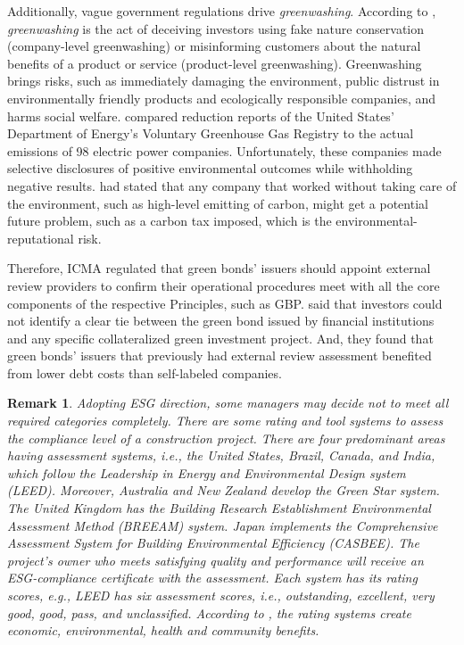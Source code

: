 \documentclass[sn-basic]{sn-jnl}%
\theoremstyle{thmstyleone}%
\theoremstyle{thmstyletwo}%
\newtheorem{remark}{Remark}%
\theoremstyle{thmstylethree}%
\begin{document}
Additionally, vague government regulations drive \emph{greenwashing}. According to \citet{delmas2011drivers}, \emph{greenwashing} is the act of deceiving investors using fake nature conservation (company-level greenwashing) or misinforming customers about the natural benefits of a product or service (product-level greenwashing). Greenwashing brings risks, such as immediately damaging the environment, public distrust in environmentally friendly products and ecologically responsible companies, and harms social welfare. \citet{kim2011strategic} compared reduction reports of the United States' Department of Energy’s Voluntary Greenhouse Gas Registry to the actual emissions of 98 electric power companies. Unfortunately, these companies made selective disclosures of positive environmental outcomes while withholding negative results. \citet{dunn2018assessing} had stated that any company that worked without taking care of the environment, such as high-level emitting of carbon, might get a potential future problem, such as a carbon tax imposed, which is the environmental-reputational risk.

Therefore, ICMA regulated that green bonds' issuers should appoint external review providers to confirm their operational procedures meet with all the core components of the respective Principles, such as GBP. \citet{fatica2021pricing} said that investors could not identify a clear tie between the green bond issued by financial institutions and any specific collateralized green investment project. And, they found that green bonds' issuers that previously had external review assessment benefited from lower debt costs than self-labeled companies.

\begin{remark}
	Adopting ESG direction, some managers may decide not to meet all required categories completely. There are some rating and tool systems to assess the compliance level of a construction project. There are four predominant areas having assessment systems, i.e., the United States, Brazil, Canada, and India, which follow the Leadership in Energy and Environmental Design system (LEED). Moreover, Australia and New Zealand develop the Green Star system. The United Kingdom has the Building Research Establishment Environmental Assessment Method (BREEAM) system. Japan implements the Comprehensive Assessment System for Building Environmental Efficiency (CASBEE). The project’s owner who meets satisfying quality and performance will receive an ESG-compliance certificate with the assessment. Each system has its rating scores, e.g., LEED has six assessment scores, i.e., outstanding, excellent, very good, good, pass, and unclassified. According to \citet{say2008sustainable}, the rating systems create economic, environmental, health and community benefits.
\end{remark}
\end{document}
